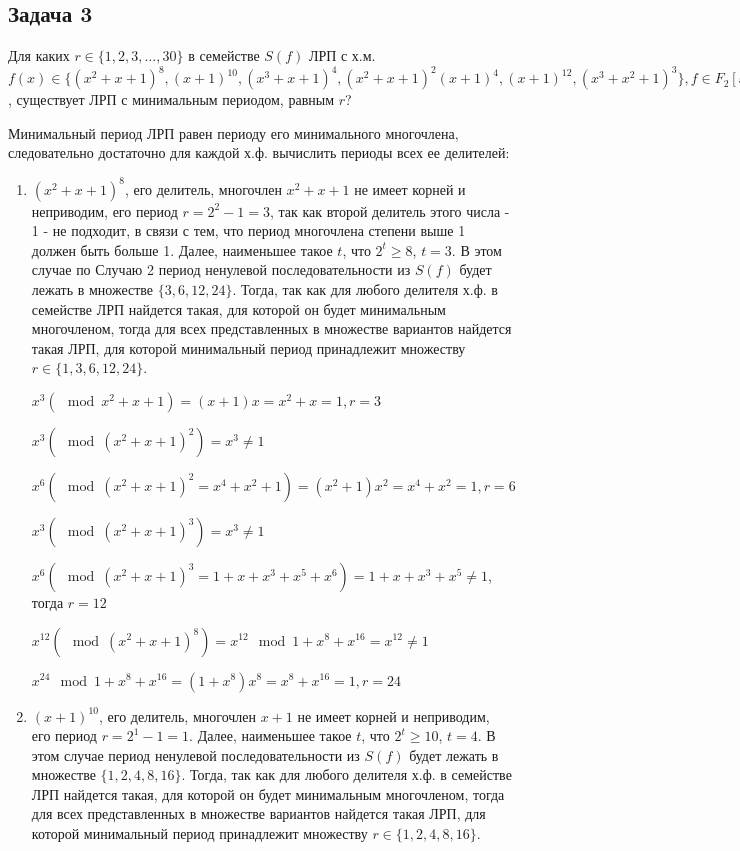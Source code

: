 \documentclass[12pt]{extarticle}
\begin{document}
\subsection{Задача 3}
Для каких $r\in\{1,2,3,…,30\}$ в семействе $S(f)$ ЛРП с х.м. $f(x)\in\{(x^2+x+1)^8, (x+1)^{10}, (x^3+x+1)^4, (x^2+x+1)^2(x+1)^4, (x+1)^{12}, (x^3+x^2+1)^3\}, f\in F_2[x]$, существует ЛРП с минимальным периодом, равным $r$?

Минимальный период ЛРП равен периоду его минимального многочлена, следовательно достаточно для каждой х.ф. вычислить периоды всех ее делителей:

\begin{enumerate}
    \item $(x^2+x+1)^8$, его делитель, многочлен $x^2+x+1$ не имеет корней и неприводим, его период $r = 2^2 -1 = 3$, так как второй делитель этого числа - 1 - не подходит, в связи с тем, что период многочлена степени выше 1 должен быть больше 1. Далее, наименьшее такое $t$, что $2^t \geq 8$, $t=3$. В этом случае по Случаю 2 период ненулевой последовательности из $S(f)$ будет лежать в множестве $\{3, 6, 12, 24\}$. Тогда, так как для любого делителя х.ф. в семействе ЛРП найдется такая, для которой он будет минимальным многочленом, тогда для всех представленных в множестве вариантов найдется такая ЛРП, для которой минимальный период принадлежит множеству $r \in \{1,3,6,12,24 \}$. 
    
    $x^3 (\mod x^2+x+1) = (x+1)x = x^2+x = 1, r = 3$
    
    $x^3 (\mod (x^2+x+1)^2) = x^3 \neq 1$
    
    $x^6 (\mod (x^2+x+1)^2 = x^4+x^2+1) = (x^2+1)x^2 = x^4+x^2 = 1, r = 6$
    
    $x^3 (\mod (x^2+x+1)^3) = x^3 \neq 1$
    
    $x^6 (\mod (x^2+x+1)^3 = 1 + x+ x^3+x^5+ x^6) = 1 + x+ x^3+x^5 \neq 1$, тогда $r = 12$
    
    $x^{12} (\mod (x^2+x+1)^8 ) = x^{12} \mod 1 + x^8 + x^{16} = x^{12} \neq 1$
    
    $x^{24} \mod 1 + x^8 + x^{16} = (1 + x^8) x^8 = x^8 + x^{16} = 1, r = 24$
    
    \item $(x+1)^{10}$, его делитель, многочлен $x+1$ не имеет корней и неприводим, его период $r = 2^1 -1 = 1$. Далее, наименьшее такое $t$, что $2^t \geq 10$, $t=4$. В этом случае период ненулевой последовательности из $S(f)$ будет лежать в множестве $\{1, 2, 4, 8, 16\}$. Тогда, так как для любого делителя х.ф. в семействе ЛРП найдется такая, для которой он будет минимальным многочленом, тогда для всех представленных в множестве вариантов найдется такая ЛРП, для которой минимальный период принадлежит множеству $r \in \{1, 2, 4, 8, 16\}$.
    

\end{enumerate}
\end{document}
